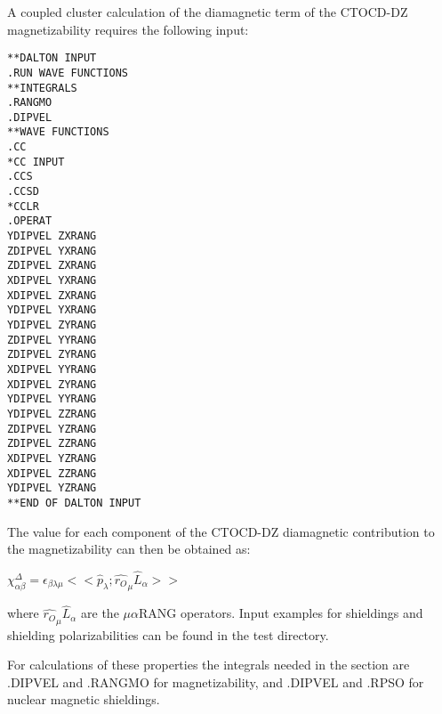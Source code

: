 A coupled cluster calculation of the diamagnetic term of the CTOCD-DZ
magnetizability requires the following input:

\begin{verbatim}
**DALTON INPUT
.RUN WAVE FUNCTIONS
**INTEGRALS
.RANGMO
.DIPVEL
**WAVE FUNCTIONS
.CC
*CC INPUT
.CCS
.CCSD
*CCLR
.OPERAT
YDIPVEL ZXRANG
ZDIPVEL YXRANG
ZDIPVEL ZXRANG
XDIPVEL YXRANG
XDIPVEL ZXRANG
YDIPVEL YXRANG
YDIPVEL ZYRANG
ZDIPVEL YYRANG
ZDIPVEL ZYRANG
XDIPVEL YYRANG
XDIPVEL ZYRANG
YDIPVEL YYRANG
YDIPVEL ZZRANG
ZDIPVEL YZRANG
ZDIPVEL ZZRANG
XDIPVEL YZRANG
XDIPVEL ZZRANG
YDIPVEL YZRANG
**END OF DALTON INPUT
\end{verbatim}

The value for each component of the CTOCD-DZ diamagnetic contribution to the
magnetizability can then be obtained as:
\begin{center}
$\chi_{\alpha\beta}^{\Delta} = \epsilon_{\beta\lambda\mu} 
<< \hat{p}_{\lambda} ; \hat{r_O}_{\mu}\hat{L}_{\alpha} >>$ 
\end{center}
where $\hat{r_O}_{\mu}\hat{L}_{\alpha}$ are the $\mu\alpha$RANG operators.
Input examples for shieldings and shielding polarizabilities can be found in
the test directory. 

For  calculations of these properties the integrals needed in
the   
section are .DIPVEL and .RANGMO for magnetizability, and .DIPVEL and .RPSO for
nuclear magnetic shieldings.

